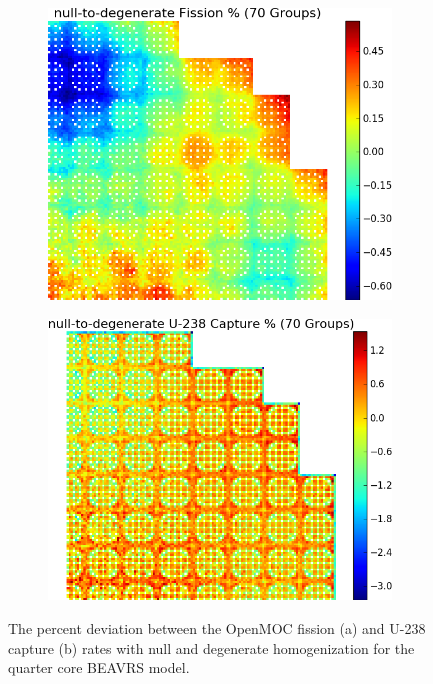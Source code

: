 \begin{appendices}
\clearpage

\begin{figure}[h!]
\centering
\begin{subfigure}{0.78\textwidth}
  \centering
  \includegraphics[width=\linewidth]{figures/patterns/appendix/compare-full-core/null-to-degenerate/fiss-comp}  	 
  \caption{}
  \label{fig:compare-null-degen-fiss}
\end{subfigure}
\begin{subfigure}{0.78\textwidth}
  \centering
  \includegraphics[width=\linewidth]{figures/patterns/appendix/compare-full-core/null-to-degenerate/capt-comp}  	 
  \caption{}
  \label{fig:compare-null-degen-capt}
\end{subfigure}
\caption[U-238 capture rate null-to-degenerate relative deviation]{The percent deviation between the OpenMOC fission (a) and U-238 capture (b) rates with null and degenerate homogenization for the quarter core \ac{BEAVRS} model.}
\label{fig:null-to-degenerate-full-core-dev}
\end{figure}


\end{appendices}
